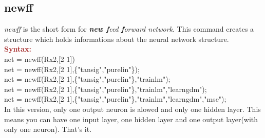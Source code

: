 \subsection{newff}
\textit{newff} is the short form for \textit{\textbf{new f}eed \textbf{f}orward network}. This command creates a structure which holds informations about the neural network structure.\\

\noindent \textbf{\textcolor{brown}{Syntax:}}\\

\noindent net = newff(Rx2,[2 1])\\
\noindent net = newff(Rx2,[2 1],\{"tansig","purelin"\});\\
\noindent net = newff(Rx2,[2 1],\{"tansig","purelin"\},"trainlm");\\
\noindent net = newff(Rx2,[2 1],\{"tansig","purelin"\},"trainlm","learngdm");\\
\noindent net = newff(Rx2,[2 1],\{"tansig","purelin"\},"trainlm","learngdm","mse");\\

In this version, only one output neuron is alowed and only one hidden layer. This means you can have one input layer, one hidden layer and one output layer(with only one neuron). That's it.\\


